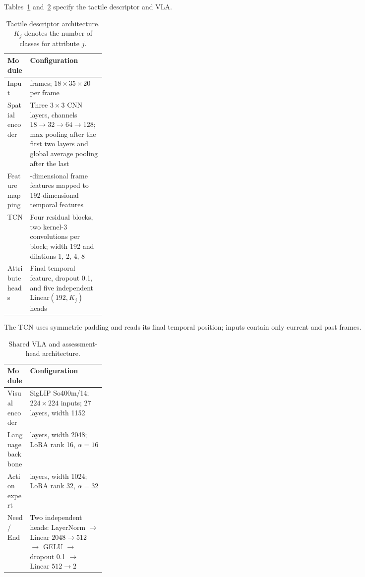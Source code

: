 Tables~\ref{tab:app_captioner_network} and~\ref{tab:app_vla_network} specify the tactile descriptor and VLA.

\begin{table}[t]
\centering
\small
\caption{Tactile descriptor architecture. $K_j$ denotes the number of classes for attribute $j$.}
\label{tab:app_captioner_network}
\setlength{\tabcolsep}{5pt}
\renewcommand{\arraystretch}{1.12}
\begin{tabularx}{\textwidth}{@{}p{0.23\linewidth}>{\raggedright\arraybackslash}X@{}}
\toprule
\textbf{Module} & \textbf{Configuration} \\
\midrule
Input & 30 frames; $18\times35\times20$ per frame \\
Spatial encoder & Three $3\times3$ CNN layers, channels $18\!\to\!32\!\to\!64\!\to\!128$; max pooling after the first two layers and global average pooling after the last \\
Feature mapping & 128-dimensional frame features mapped to 192-dimensional temporal features \\
TCN & Four residual blocks, two kernel-3 convolutions per block; width 192 and dilations 1, 2, 4, 8 \\
Attribute heads & Final temporal feature, dropout 0.1, and five independent Linear$(192,K_j)$ heads \\
\bottomrule
\end{tabularx}
\end{table}

The TCN uses symmetric padding and reads its final temporal position; inputs contain only current and past frames.

\begin{table}[t]
\centering
\small
\caption{Shared VLA and assessment-head architecture.}
\label{tab:app_vla_network}
\setlength{\tabcolsep}{5pt}
\renewcommand{\arraystretch}{1.12}
\begin{tabularx}{\textwidth}{@{}p{0.23\linewidth}>{\raggedright\arraybackslash}X@{}}
\toprule
\textbf{Module} & \textbf{Configuration} \\
\midrule
Visual encoder & SigLIP So400m/14; $224\times224$ inputs; 27 layers, width 1152 \\
Language backbone & 18 layers, width 2048; LoRA rank 16, $\alpha=16$ \\
Action expert & 18 layers, width 1024; LoRA rank 32, $\alpha=32$ \\
Need / End & Two independent heads: LayerNorm $\to$ Linear $2048\!\to\!512$ $\to$ GELU $\to$ dropout 0.1 $\to$ Linear $512\!\to\!2$ \\
\bottomrule
\end{tabularx}
\end{table}

